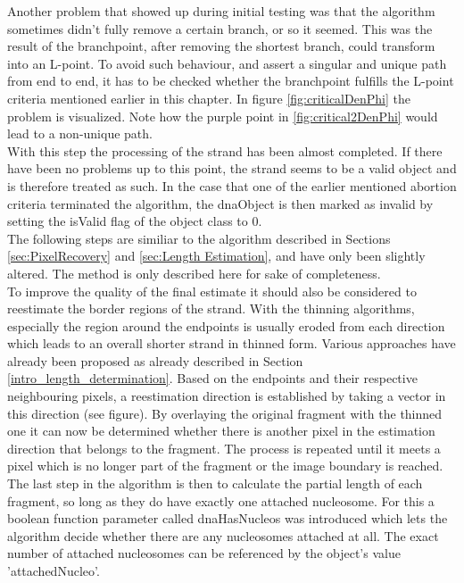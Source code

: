 \documentclass{article}
\begin{document}
Another problem that showed up during initial testing was that the algorithm sometimes didn't fully remove a certain branch, or so it seemed. This was the result of the branchpoint, after removing the shortest branch, could transform into an L-point. To avoid such behaviour, and assert a singular and unique path from end to end, it has to be checked whether the branchpoint fulfills the L-point criteria mentioned earlier in this chapter. In figure \ref{fig:criticalDenPhi} the problem is visualized. Note how the purple point in \ref{fig:critical2DenPhi} would lead to a non-unique path.\\
With this step the processing of the strand has been almost completed. If there have been no problems up to this point, the strand seems to be a valid object and is therefore treated as such. In the case that one of the earlier mentioned abortion criteria terminated the algorithm, the dnaObject is then marked as invalid by setting the isValid flag of the object class to 0. \\
The following steps are similiar to the algorithm described in Sections \ref{sec:PixelRecovery} and \ref{sec:Length Estimation}, and have only been slightly altered. The method is only described here for sake of completeness. 
\\
To improve the quality of the final estimate it should also be considered to reestimate the border regions of the strand. With the thinning algorithms, especially the region around the endpoints is usually eroded from each direction which leads to an overall shorter strand in thinned form. Various approaches have already been proposed as already described in Section \ref{intro_length_determination}. Based on the endpoints and their respective neighbouring pixels, a reestimation direction is established by taking a vector in this direction (see figure). By overlaying the original fragment with the thinned one it can now be determined whether there is another pixel in the estimation direction that belongs to the fragment. The process is repeated until it meets a pixel which is no longer part of the fragment or the image boundary is reached. \\
The last step in the algorithm is then to calculate the partial length of each fragment, so long as they do have exactly one attached nucleosome. For this a boolean function parameter called dnaHasNucleos was introduced which lets the algorithm decide whether there are any nucleosomes attached at all. The exact number of attached nucleosomes can be referenced by the object's value 'attachedNucleo'. \\
\end{document}

